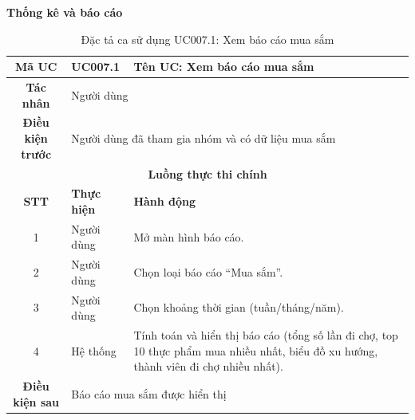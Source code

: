 \textbf{Thống kê và báo cáo}
\begin{table}[H]
    \centering
    \label{tab:uc007-1}
    \begin{tabularx}{\textwidth}{|c|p{3.5cm}|X|}
        \hline
        \rowcolor{headergreen} 
        \textbf{Mã UC} & \textbf{UC007.1} & \textbf{Tên UC: Xem báo cáo mua sắm} \\ \hline
        \textbf{Tác nhân} & \multicolumn{2}{l|}{Người dùng} \\ \hline
        \textbf{Điều kiện trước} & \multicolumn{2}{X|}{Người dùng đã tham gia nhóm và có dữ liệu mua sắm} \\ \hline
        
        \multicolumn{3}{|c|}{\cellcolor{headerorange}\textbf{Luồng thực thi chính}} \\ \hline
        \rowcolor{graybg} \textbf{STT} & \textbf{Thực hiện} & \textbf{Hành động} \\ \hline
        1 & Người dùng & Mở màn hình báo cáo. \\ \hline
        2 & Người dùng & Chọn loại báo cáo ``Mua sắm''. \\ \hline
        3 & Người dùng & Chọn khoảng thời gian (tuần/tháng/năm). \\ \hline
        4 & Hệ thống & Tính toán và hiển thị báo cáo (tổng số lần đi chợ, top 10 thực phẩm mua nhiều nhất, biểu đồ xu hướng, thành viên đi chợ nhiều nhất). \\ \hline
        
        \textbf{Điều kiện sau} & \multicolumn{2}{X|}{Báo cáo mua sắm được hiển thị} \\ \hline
    \end{tabularx}
    \caption{Đặc tả ca sử dụng UC007.1: Xem báo cáo mua sắm}
\end{table}

